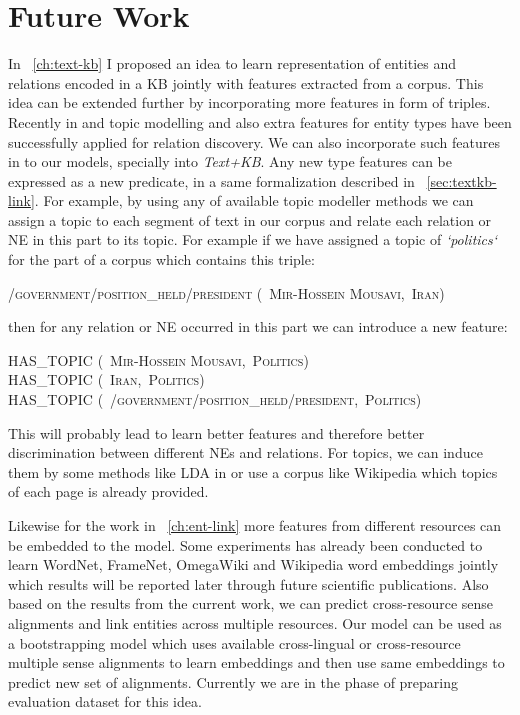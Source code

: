 \chapter{Future Work}
In ~\autoref{ch:text-kb} I proposed an idea to learn representation of entities
and relations encoded in a KB jointly with features extracted from a corpus.
This idea can be extended further by incorporating more features in form of
triples. Recently in \cite{Yao2012} and \cite{Riedel2010} topic
modelling and also extra features for entity types have been successfully
applied for relation discovery. We can also incorporate such features in to our
models, specially into \textit{Text+KB}. Any new type features can be expressed
as a new predicate, in a same formalization described in
~\autoref{sec:textkb-link}. For example, by using any of available topic
modeller methods we can assign a topic to each segment of text in our corpus and
relate each relation or NE in this part to its topic. For example if we have
assigned a topic of \textit{`politics`} for the part of a corpus which
contains this triple:
\begin{center}
 \textsc{ /government/position\_held/president (~Mir-Hossein Mousavi,~Iran)}
 \end{center}

then for any relation or NE occurred in this part we can introduce a
new feature:

\begin{center}
 \textsc{HAS\_TOPIC (~Mir-Hossein Mousavi,~Politics)}\\
 \textsc{HAS\_TOPIC (~Iran,~Politics)}\\
 \textsc{HAS\_TOPIC (~/government/position\_held/president,~Politics)}\\
 \end{center}

 This will probably lead to learn better features and therefore better
 discrimination between different NEs and relations. For topics, we can induce
 them by some methods like LDA in \cite{Blei2003} or use a corpus like Wikipedia
  which topics of each page is already provided.
  
  Likewise for the work in ~\autoref{ch:ent-link} more features from different
  resources can be embedded to the model. Some experiments has already been
  conducted to learn WordNet, FrameNet, OmegaWiki and Wikipedia word embeddings
  jointly which results will be reported later through future scientific
  publications. Also based on the results from the current work, we can predict
  cross-resource sense alignments and link entities across multiple resources.
  Our model can be used as a bootstrapping model which uses available
  cross-lingual or cross-resource multiple sense alignments to learn embeddings
  and then use same embeddings to predict new set of alignments. Currently we
  are in the phase of preparing evaluation dataset for this idea.
 
